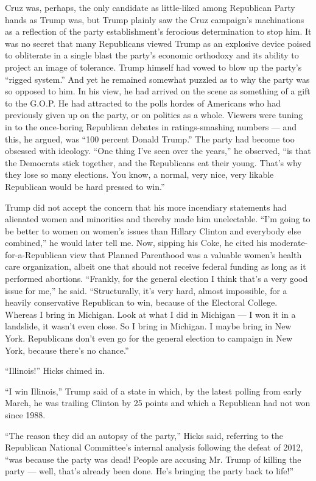 Cruz was, perhaps, the only candidate as little-liked among Republican
Party hands as Trump was, but Trump plainly saw the Cruz campaign's
machinations as a reflection of the party establishment's ferocious
determination to stop him. It was no secret that many Republicans viewed
Trump as an explosive device poised to obliterate in a single blast the
party's economic orthodoxy and its ability to project an image of
tolerance. Trump himself had vowed to blow up the party's ``rigged
system.'' And yet he remained somewhat puzzled as to why the party was
so opposed to him. In his view, he had arrived on the scene as something
of a gift to the G.O.P. He had attracted to the polls hordes of
Americans who had previously given up on the party, or on politics as a
whole. Viewers were tuning in to the once-boring Republican debates in
ratings-smashing numbers --- and this, he argued, was ``100 percent
Donald Trump.'' The party had become too obsessed with ideology. ``One
thing I've seen over the years,'' he observed, ``is that the Democrats
stick together, and the Republicans eat their young. That's why they
lose so many elections. You know, a normal, very nice, very likable
Republican would be hard pressed to win.''

Trump did not accept the concern that his more incendiary statements had
alienated women and minorities and thereby made him unelectable. ``I'm
going to be better to women on women's issues than Hillary Clinton and
everybody else combined,'' he would later tell me. Now, sipping his
Coke, he cited his moderate-for-a-Republican view that Planned
Parenthood was a valuable women's health care organization, albeit one
that should not receive federal funding as long as it performed
abortions. ``Frankly, for the general election I think that's a very
good issue for me,'' he said. ``Structurally, it's very hard, almost
impossible, for a heavily conservative Republican to win, because of the
Electoral College. Whereas I bring in Michigan. Look at what I did in
Michigan --- I won it in a landslide, it wasn't even close. So I bring
in Michigan. I maybe bring in New York. Republicans don't even go for
the general election to campaign in New York, because there's no
chance.''

``Illinois!'' Hicks chimed in.

``I win Illinois,'' Trump said of a state in which, by the latest
polling from early March, he was trailing Clinton by 25 points and which
a Republican had not won since 1988.

``The reason they did an autopsy of the party,'' Hicks said, referring
to the Republican National Committee's internal analysis following the
defeat of 2012, ``was because the party was dead! People are accusing
Mr. Trump of killing the party --- well, that's already been done. He's
bringing the party back to life!''

